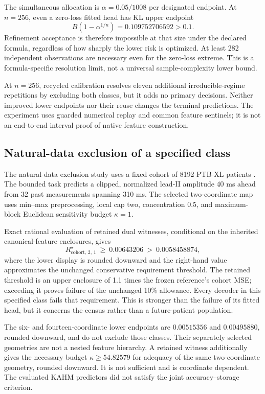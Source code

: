 The simultaneous allocation is $\alpha=0.05/1008$ per designated endpoint. At $n=256$, even a zero-loss fitted head has KL upper endpoint
\[
B(1-\alpha^{1/n})=0.109752706592>0.1.
\]
Refinement acceptance is therefore impossible at that size under the declared formula, regardless of how sharply the lower risk is optimized. At least 282 independent observations are necessary even for the zero-loss extreme. This is a formula-specific resolution limit, not a universal sample-complexity lower bound.

At $n=256$, recycled calibration resolves eleven additional irreducible-regime repetitions by excluding both classes, but it adds no primary decisions. Neither improved lower endpoints nor their reuse changes the terminal predictions. The experiment uses guarded numerical replay and common feature sentinels; it is not an end-to-end interval proof of native feature construction.

\subsection{Natural-data exclusion of a specified class}
The natural-data exclusion study uses a fixed cohort of 8192 PTB-XL patients \citep{wagner2020ptbxl,wagner2022ptbxl103}. The bounded task predicts a clipped, normalized lead-II amplitude 40 ms ahead from 32 past measurements spanning 310 ms. The selected two-coordinate map uses min--max preprocessing, local cap two, concentration $0.5$, and maximum-block Euclidean sensitivity budget $\kappa=1$.

Exact rational evaluation of retained dual witnesses, conditional on the inherited canonical-feature enclosures, gives
\[
R^\star_{\mathrm{cohort},\,2,\,1}
\ \geq\ 0.00643206
\ >\ 0.0058458874,
\]
where the lower display is rounded downward and the right-hand value approximates the unchanged conservative requirement threshold. The retained threshold is an upper enclosure of 1.1 times the frozen reference's cohort MSE; exceeding it proves failure of the unchanged 10\% allowance. Every decoder in this specified class fails that requirement. This is stronger than the failure of its fitted head, but it concerns the census rather than a future-patient population.

The six- and fourteen-coordinate lower endpoints are $0.00515356$ and $0.00495880$, rounded downward, and do not exclude those classes. Their separately selected geometries are not a nested feature hierarchy. A retained witness additionally gives the necessary budget $\kappa\geq54.82579$ for adequacy of the same two-coordinate geometry, rounded downward. It is not sufficient and is coordinate dependent. The evaluated KAHM predictors did not satisfy the joint accuracy--storage criterion.

